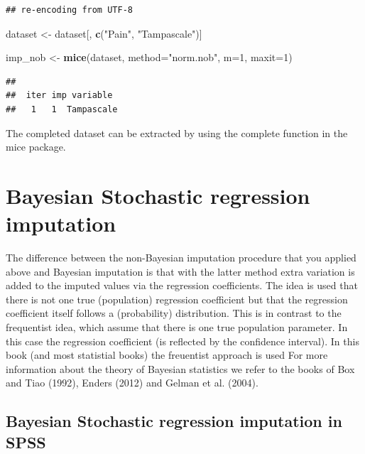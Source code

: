 \documentclass[]{book}
\newenvironment{Shaded}{\begin{snugshade}}{\end{snugshade}}
\newcommand{\KeywordTok}[1]{\textcolor[rgb]{0.13,0.29,0.53}{\textbf{#1}}}
\newcommand{\DataTypeTok}[1]{\textcolor[rgb]{0.13,0.29,0.53}{#1}}
\newcommand{\DecValTok}[1]{\textcolor[rgb]{0.00,0.00,0.81}{#1}}
\newcommand{\StringTok}[1]{\textcolor[rgb]{0.31,0.60,0.02}{#1}}
\newcommand{\NormalTok}[1]{#1}
\theoremstyle{definition}
\theoremstyle{definition}
\theoremstyle{definition}
\theoremstyle{remark}
\begin{document}
\begin{verbatim}
## re-encoding from UTF-8
\end{verbatim}

\begin{Shaded}
\begin{Highlighting}[]
\NormalTok{dataset <-}\StringTok{ }\NormalTok{dataset[, }\KeywordTok{c}\NormalTok{(}\StringTok{"Pain"}\NormalTok{, }\StringTok{"Tampascale"}\NormalTok{)]}

\NormalTok{imp_nob <-}\StringTok{ }\KeywordTok{mice}\NormalTok{(dataset, }\DataTypeTok{method=}\StringTok{"norm.nob"}\NormalTok{, }\DataTypeTok{m=}\DecValTok{1}\NormalTok{, }\DataTypeTok{maxit=}\DecValTok{1}\NormalTok{)}
\end{Highlighting}
\end{Shaded}

\begin{verbatim}
## 
##  iter imp variable
##   1   1  Tampascale
\end{verbatim}

The completed dataset can be extracted by using the complete function in
the mice package.

\section{Bayesian Stochastic regression
imputation}\label{bayesian-stochastic-regression-imputation}

The difference between the non-Bayesian imputation procedure that you
applied above and Bayesian imputation is that with the latter method
extra variation is added to the imputed values via the regression
coefficients. The idea is used that there is not one true (population)
regression coefficient but that the regression coefficient itself
follows a (probability) distribution. This is in contrast to the
frequentist idea, which assume that there is one true population
parameter. In this case the regression coefficient (is reflected by the
confidence interval). In this book (and most statistial books) the
freuentist approach is used For more information about the theory of
Bayesian statistics we refer to the books of Box and Tiao (1992), Enders
(2012) and Gelman et al. (2004).

\subsection{Bayesian Stochastic regression imputation in
SPSS}\label{bayesian-stochastic-regression-imputation-in-spss}
\end{document}

